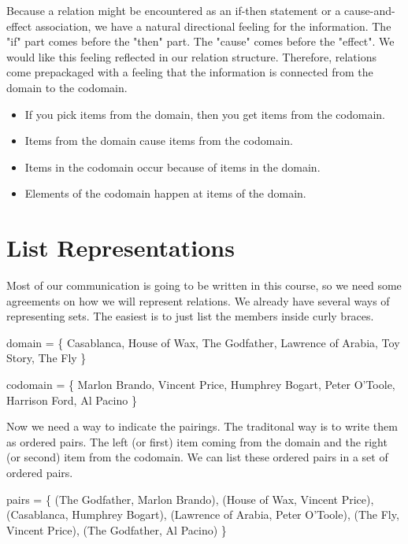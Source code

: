 \documentclass{ximera}
\begin{document}
Because a relation might be encountered as an if-then statement or a cause-and-effect association, we have a natural directional feeling for the information.  The "if" part comes before the "then" part.  The "cause" comes before the "effect".  We would like this feeling reflected in our relation structure.  Therefore, relations come prepackaged with a feeling that the information is connected from the domain to the codomain.

\begin{itemize}
\item If you pick items from the domain, then you get items from the codomain.
\item Items from the domain cause items from the codomain.
\item Items in the codomain occur because of items in the domain.
\item Elements of the codomain happen at items of the domain.
\end{itemize}



\section{List Representations}

Most of our communication is going to be written in this course, so we need some agreements on how we will represent relations.  We already have several ways of representing sets.  The easiest is to just list the members inside curly braces.

\begin{center} 
domain = \{ Casablanca, House of Wax,  The Godfather, Lawrence of Arabia, Toy Story, The Fly \} 
\end{center}

\begin{center} 
codomain = \{ Marlon Brando, Vincent Price, Humphrey Bogart, Peter O'Toole, Harrison Ford, Al Pacino \} 
\end{center}

Now we need a way to indicate the pairings.  The traditonal way is to write them as ordered pairs.  The left (or first) item coming from the domain and the right (or second) item from the codomain.  We can list these ordered pairs in a set of ordered pairs. 

\begin{center} 
pairs = \{ (The Godfather, Marlon Brando), (House of Wax, Vincent Price), (Casablanca, Humphrey Bogart), (Lawrence of Arabia, Peter O'Toole), (The Fly, Vincent Price), (The Godfather, Al Pacino) \} 
\end{center}
\end{document}
